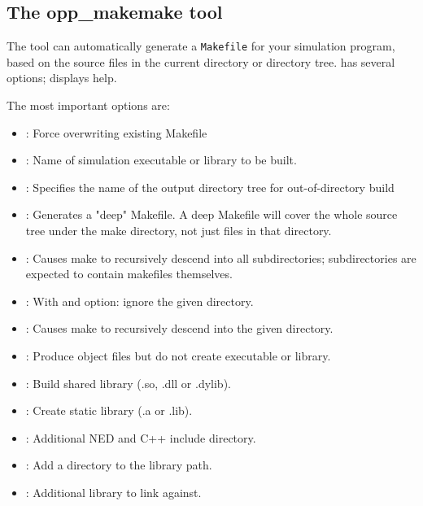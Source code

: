 \subsection{The opp\_makemake tool}

The  tool can automatically generate a
\texttt{Makefile} for your simulation program, based on the source files
in the current directory or directory tree.
 has several options; 
displays help.

The most important options are:

\begin{itemize}
    \item{ : Force overwriting existing Makefile}
    \item{ : Name of simulation executable or library to be built.}
    \item{ : Specifies the name of the output directory tree
                          for out-of-directory build}
    \item{ : Generates a "deep" Makefile. A deep Makefile will
                          cover the whole source tree under the make directory,
                          not just files in that directory.}
    \item{ : Causes make to recursively descend into all subdirectories;
                          subdirectories are expected to contain
                          makefiles themselves.}
    \item{ :
                          With  and  option: ignore the given directory.}
    \item{ :
                          Causes make to recursively descend into the given
                          directory.}
    \item{ :  Produce object files but do not create executable or
                          library.}
    \item{ : Build shared library (.so, .dll or .dylib).}
    \item{ : Create static library (.a or .lib).}
    \item{ :         Additional NED and C++ include directory.}
    \item{ :         Add a directory to the library path.}
    \item{ :     Additional library to link against.}
\end{itemize}


